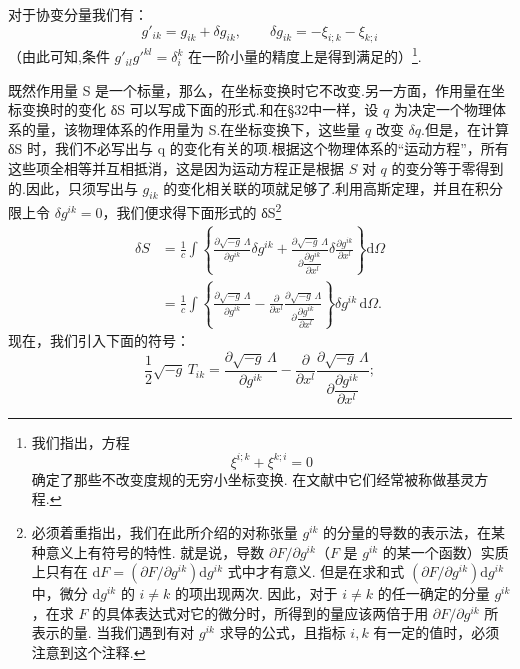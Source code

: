 对于协变分量我们有：
\begin{equation}
  g'_{ik}=g_{ik}+\delta g_{ik},\qquad
  \delta g_{ik}=-\xi_{i;k}-\xi_{k;i}
\end{equation}
（由此可知,条件 $g'_{il}g'^{kl}=\delta^k_i$ 在一阶小量的精度上是得到满足的）\footnote{我们指出，方程
\begin{equation*}
  \xi^{i;k}+\xi^{k;i}=0
\end{equation*}
确定了那些不改变度规的无穷小坐标变换. 在文献中它们经常被称做基灵方程.}.

既然作用量 S 是一个标量，那么，在坐标变换时它不改变.另一方面，作用量在坐标变换时的变化 δS 可以写成下面的形式.和在§32中一样，设 $q$ 为决定一个物理体系的量，该物理体系的作用量为 S.在坐标变换下，这些量 $q$ 改变 $\delta q$.但是，在计算 δS 时，我们不必写出与 q 的变化有关的项.根据这个物理体系的“运动方程”，所有这些项全相等并互相抵消，这是因为运动方程正是根据 $S$ 对 $q$ 的变分等于零得到的.因此，只须写出与 $g_{ik}$ 的变化相关联的项就足够了.利用高斯定理，并且在积分限上令 $\delta g^{ik}=0$，我们便求得下面形式的 δS\footnote{必须着重指出，我们在此所介绍的对称张量 $g^{ik}$ 的分量的导数的表示法，在某种意义上有符号的特性. 就是说，导数 $\partial F/\partial g^{ik}$（$F$ 是 $g^{ik}$ 的某一个函数）实质上只有在 $\mathrm{d}F=(\partial F/\partial g^{ik})\mathrm{d}g^{ik}$ 式中才有意义. 但是在求和式 $(\partial F/\partial g^{ik})\mathrm{d}g^{ik}$ 中，微分 $\mathrm{d}g^{ik}$ 的 $i\neq k$ 的项出现两次. 因此，对于 $i\neq k$ 的任一确定的分量 $g^{ik}$，在求 $F$ 的具体表达式对它的微分时，所得到的量应该两倍于用 $\partial F/\partial g^{ik}$ 所表示的量. 当我们遇到有对 $g^{ik}$ 求导的公式，且指标 $i,k$ 有一定的值时，必须注意到这个注释.}
\begin{equation*}
\begin{aligned}
  \delta S&=\frac{1}{c}\int\left\{
  \frac{\partial\sqrt{-g}\,\varLambda}{\partial g^{ik}}\delta g^{ik}
  +\frac{\partial\sqrt{-g}\,\varLambda}
  {\partial\dfrac{\partial g^{ik}}{\partial x^l}}
  \delta\frac{\partial g^{ik}}{\partial x^l}\right\}\mathrm{d}\varOmega\\
  &=\frac{1}{c}\int\left\{
  \frac{\partial\sqrt{-g}\,\varLambda}{\partial g^{ik}}
  -\frac{\partial}{\partial x^l}
  \frac{\partial\sqrt{-g}\,\varLambda}
  {\partial\dfrac{\partial g^{ik}}{\partial x^l}}\right\}
  \delta g^{ik}\,\mathrm{d}\varOmega.
\end{aligned}
\end{equation*}
现在，我们引入下面的符号：
\begin{equation}
  \frac{1}{2}\sqrt{-g}\,T_{ik}
  =\frac{\partial\sqrt{-g}\,\varLambda}{\partial g^{ik}}
  -\frac{\partial}{\partial x^l}
  \frac{\partial\sqrt{-g}\,\varLambda}
  {\partial\dfrac{\partial g^{ik}}{\partial x^l}};
\end{equation}
